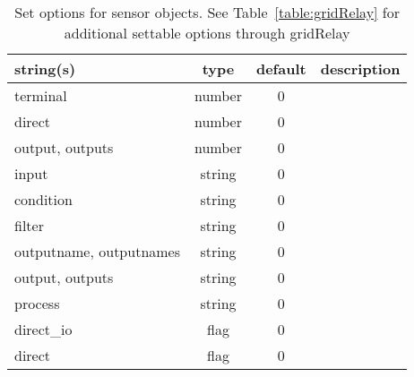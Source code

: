 \begin{table}[ht]
\centering
\begin{tabular}{p{5cm} c c p{7cm}}
\hline
string(s) & type & default & description \\
\hline
terminal & number & 0 & \\
direct & number & 0 & \\
output, outputs & number & 0 & \\
input & string & 0 & \\
condition & string & 0 & \\
filter & string & 0 & \\
outputname, outputnames & string & 0 & \\
output, outputs & string & 0 & \\
process & string & 0 & \\
direct\_io & flag & 0 & \\
direct & flag & 0 & \\
\hline
\end{tabular}
\caption{Set options for sensor objects. See Table~\ref{table:gridRelay} for additional settable options through gridRelay}
\label{table:sensor}
\end{table}
